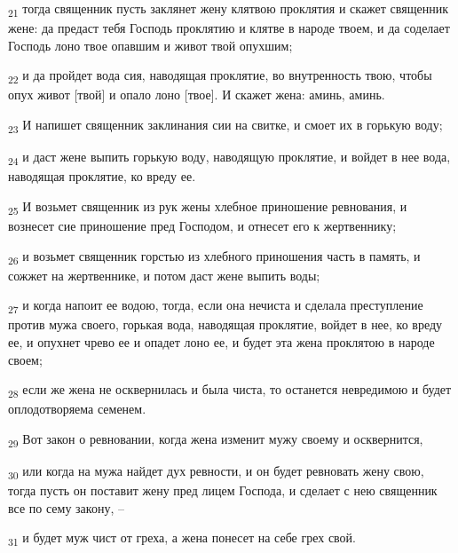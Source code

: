 \begin{tcolorbox}
\textsubscript{21} тогда священник пусть заклянет жену клятвою проклятия и скажет священник жене: да предаст тебя Господь проклятию и клятве в народе твоем, и да соделает Господь лоно твое опавшим и живот твой опухшим;
\end{tcolorbox}
\begin{tcolorbox}
\textsubscript{22} и да пройдет вода сия, наводящая проклятие, во внутренность твою, чтобы опух живот [твой] и опало лоно [твое]. И скажет жена: аминь, аминь.
\end{tcolorbox}
\begin{tcolorbox}
\textsubscript{23} И напишет священник заклинания сии на свитке, и смоет их в горькую воду;
\end{tcolorbox}
\begin{tcolorbox}
\textsubscript{24} и даст жене выпить горькую воду, наводящую проклятие, и войдет в нее вода, наводящая проклятие, ко вреду ее.
\end{tcolorbox}
\begin{tcolorbox}
\textsubscript{25} И возьмет священник из рук жены хлебное приношение ревнования, и вознесет сие приношение пред Господом, и отнесет его к жертвеннику;
\end{tcolorbox}
\begin{tcolorbox}
\textsubscript{26} и возьмет священник горстью из хлебного приношения часть в память, и сожжет на жертвеннике, и потом даст жене выпить воды;
\end{tcolorbox}
\begin{tcolorbox}
\textsubscript{27} и когда напоит ее водою, тогда, если она нечиста и сделала преступление против мужа своего, горькая вода, наводящая проклятие, войдет в нее, ко вреду ее, и опухнет чрево ее и опадет лоно ее, и будет эта жена проклятою в народе своем;
\end{tcolorbox}
\begin{tcolorbox}
\textsubscript{28} если же жена не осквернилась и была чиста, то останется невредимою и будет оплодотворяема семенем.
\end{tcolorbox}
\begin{tcolorbox}
\textsubscript{29} Вот закон о ревновании, когда жена изменит мужу своему и осквернится,
\end{tcolorbox}
\begin{tcolorbox}
\textsubscript{30} или когда на мужа найдет дух ревности, и он будет ревновать жену свою, тогда пусть он поставит жену пред лицем Господа, и сделает с нею священник все по сему закону, --
\end{tcolorbox}
\begin{tcolorbox}
\textsubscript{31} и будет муж чист от греха, а жена понесет на себе грех свой.
\end{tcolorbox}
